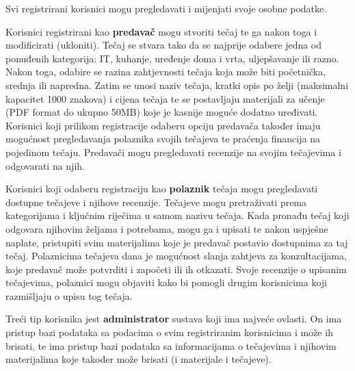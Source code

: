 	Svi registrirani korisnici mogu pregledavati i mijenjati svoje osobne podatke.
	
	Korisnici registrirani kao \textbf{predavač} mogu stvoriti tečaj te ga nakon toga i modificirati (ukloniti). Tečaj se stvara tako da se najprije odabere jedna od ponuđenih kategorija: IT, kuhanje, uređenje doma i vrta, uljepšavanje ili razno. Nakon toga, odabire se razina zahtjevnosti tečaja koja može biti početnička, srednja ili napredna. Zatim se unosi naziv tečaja, kratki opis po želji (maksimalni kapacitet 1000 znakova) i cijena tečaja te se postavljaju materijali za učenje (PDF format do ukupno 50MB) koje je kasnije moguće dodatno uređivati. Korisnici koji prilikom registracije odaberu opciju predavača također imaju mogućnost pregledavanja polaznika svojih tečajeva te praćenja financija na pojedinom tečaju. Predavači mogu pregledavati recenzije na svojim tečajevima i odgovarati na njih.
	
	Korisnici koji odaberu registraciju kao \textbf{polaznik} tečaja mogu pregledavati dostupne tečajeve i njihove recenzije. Tečajeve mogu pretraživati prema kategorijama i ključnim riječima u samom nazivu tečaja. Kada pronađu tečaj koji odgovara njihovim željama i potrebama, mogu ga i upisati te nakon uspješne naplate, pristupiti svim materijalima koje je predavač postavio dostupnima za taj tečaj. Polaznicima tečajeva dana je mogućnost slanja zahtjeva za konzultacijama, koje predavač može potvrditi i započeti ili ih otkazati. Svoje recenzije o upisanim tečajevima, polaznici mogu objaviti kako bi pomogli drugim korisnicima koji razmišljaju o upisu tog tečaja.
	
	Treći tip korisnika jest \textbf{administrator} sustava koji ima najveće ovlasti. On ima pristup bazi podataka sa podacima o svim registriranim korisnicima i može ih brisati, te ima pristup bazi podataka sa informacijama o tečajevima i njihovim materijalima koje također može brisati (i materijale i tečajeve).
		\eject
		

	